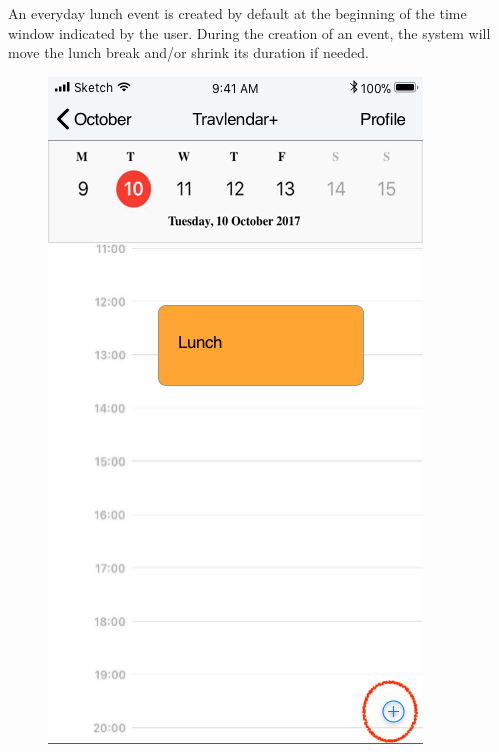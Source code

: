 An everyday lunch event is created by default at the beginning of the time window indicated by the user. During the creation of an event, the system will move the lunch break and/or shrink its duration if needed.
\begin{figure}[H]
	\centering
	\includegraphics[scale=0.23]{Images/Interface/Lunch/1_calendar+lunch}
	\hspace{0.5cm}

\end{figure}
